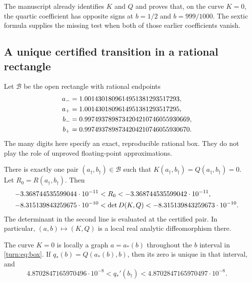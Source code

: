 The manuscript already identifies $K$ and $Q$ and proves that, on
the curve $K=0$, the quartic coefficient has opposite signs at
$b=1/2$ and $b=999/1000$.  The sextic formula supplies the missing
test when both of those earlier coefficients vanish.

\subsection{A unique certified transition in a rational rectangle}
\label{turn:sec:certificate}

Let $\mathcal B$ be the open rectangle with rational endpoints
\begin{align}
 a_-&=1.0014301809614951381293517293,\notag\\
 a_+&=1.0014301809614951381293517295,\notag\\
 b_-&=0.9974937898734204210746055930669,\notag\\
 b_+&=0.9974937898734204210746055930670.
 \label{turn:eq:box}
\end{align}
The many digits here specify an exact, reproducible rational box.
They do not play the role of unproved floating-point approximations.

\begin{theorem}
\label{turn:thm:transition}
There is exactly one pair $(a_\dagger,b_\dagger)\in\mathcal B$ such
that $K(a_\dagger,b_\dagger)=Q(a_\dagger,b_\dagger)=0$.
Let $R_0=R(a_\dagger,b_\dagger)$.  Then
\begin{align}
 -3.368744535599044\cdot10^{-11}
  &<R_0<-3.368744535599042\cdot10^{-11},\notag\\
 -8.315139843259675\cdot10^{-10}
  &<\det D(K,Q)<-8.315139843259673\cdot10^{-10}.
 \label{turn:eq:certified-main}
\end{align}
The determinant in the second line is evaluated at the certified pair.
In particular, $(a,b)\mapsto(K,Q)$ is a local real analytic
diffeomorphism there.

The curve $K=0$ is locally a graph $a=a_*(b)$ throughout the
$b$ interval in \eqref{turn:eq:box}.  If
$q_*(b)=Q(a_*(b),b)$, then its zero is unique in that interval, and
\begin{equation}
 4.8702847165970496\cdot10^{-8}
 <q_*'(b_\dagger)<4.8702847165970497\cdot10^{-8}.
 \label{turn:eq:qprime}
\end{equation}
\end{theorem}


